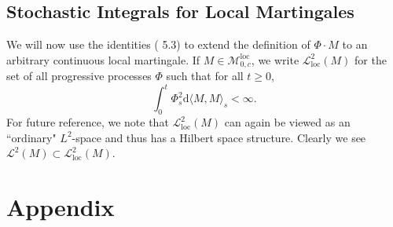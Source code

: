 \documentclass{article}
\theoremstyle{nonumberplain}
\begin{document}
\subsection{Stochastic Integrals for Local Martingales}

We will now use the identities ( 5.3) to extend the definition of $\Phi \cdot M$ to an arbitrary continuous local martingale. If $M\in\mathscr{M}^{\mathrm{loc}}_{0,c}$, we write $\mathscr{L}_{\mathrm{loc}}^{2}(M)$ for the set of all progressive processes $\Phi$ such that for all $t\ge0$,
\[
\int_{0}^{t} \Phi_{s}^{2} \mathrm{d}\langle M, M\rangle_{s}<\infty.
\]
For future reference, we note that $\mathscr{L}_{\mathrm{loc}}^{2}(M)$ can again be viewed as an ``ordinary" $L^{2}$-space and thus has a Hilbert space structure. Clearly we see $\mathscr{L}^{2}(M)\subset\mathscr{L}_{\mathrm{loc}}^{2}(M)$.

\newpage

\section*{Appendix}
\end{document}
